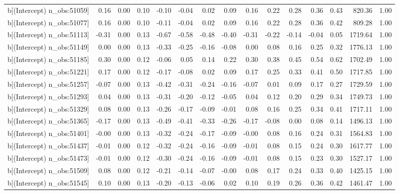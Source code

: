 \begin{table}[ht]
\begin{tabular}{rrrrrrrrrrrrrrr}
  b[(Intercept) n\_obs:51059] & 0.16 & 0.00 & 0.10 & -0.10 & -0.04 & 0.02 & 0.09 & 0.16 & 0.22 & 0.28 & 0.36 & 0.43 & 820.36 & 1.00 \\ 
  b[(Intercept) n\_obs:51077] & 0.16 & 0.00 & 0.10 & -0.11 & -0.04 & 0.02 & 0.09 & 0.16 & 0.22 & 0.28 & 0.36 & 0.42 & 809.28 & 1.00 \\ 
  b[(Intercept) n\_obs:51113] & -0.31 & 0.00 & 0.13 & -0.67 & -0.58 & -0.48 & -0.40 & -0.31 & -0.22 & -0.14 & -0.04 & 0.05 & 1719.64 & 1.00 \\ 
  b[(Intercept) n\_obs:51149] & 0.00 & 0.00 & 0.13 & -0.33 & -0.25 & -0.16 & -0.08 & 0.00 & 0.08 & 0.16 & 0.25 & 0.32 & 1776.13 & 1.00 \\ 
  b[(Intercept) n\_obs:51185] & 0.30 & 0.00 & 0.12 & -0.06 & 0.05 & 0.14 & 0.22 & 0.30 & 0.38 & 0.45 & 0.54 & 0.62 & 1702.49 & 1.00 \\ 
  b[(Intercept) n\_obs:51221] & 0.17 & 0.00 & 0.12 & -0.17 & -0.08 & 0.02 & 0.09 & 0.17 & 0.25 & 0.33 & 0.41 & 0.50 & 1717.85 & 1.00 \\ 
  b[(Intercept) n\_obs:51257] & -0.07 & 0.00 & 0.13 & -0.42 & -0.31 & -0.24 & -0.16 & -0.07 & 0.01 & 0.09 & 0.17 & 0.27 & 1729.59 & 1.00 \\ 
  b[(Intercept) n\_obs:51293] & 0.04 & 0.00 & 0.13 & -0.31 & -0.20 & -0.12 & -0.05 & 0.04 & 0.12 & 0.20 & 0.29 & 0.34 & 1749.73 & 1.00 \\ 
  b[(Intercept) n\_obs:51329] & 0.08 & 0.00 & 0.13 & -0.26 & -0.17 & -0.09 & -0.01 & 0.08 & 0.16 & 0.25 & 0.34 & 0.41 & 1717.11 & 1.00 \\ 
  b[(Intercept) n\_obs:51365] & -0.17 & 0.00 & 0.13 & -0.49 & -0.41 & -0.33 & -0.26 & -0.17 & -0.08 & 0.00 & 0.08 & 0.14 & 1496.13 & 1.00 \\ 
  b[(Intercept) n\_obs:51401] & -0.00 & 0.00 & 0.13 & -0.32 & -0.24 & -0.17 & -0.09 & -0.00 & 0.08 & 0.16 & 0.24 & 0.31 & 1564.83 & 1.00 \\ 
  b[(Intercept) n\_obs:51437] & -0.01 & 0.00 & 0.12 & -0.32 & -0.24 & -0.16 & -0.09 & -0.01 & 0.08 & 0.15 & 0.24 & 0.30 & 1617.77 & 1.00 \\ 
  b[(Intercept) n\_obs:51473] & -0.01 & 0.00 & 0.12 & -0.30 & -0.24 & -0.16 & -0.09 & -0.01 & 0.08 & 0.15 & 0.23 & 0.30 & 1527.17 & 1.00 \\ 
  b[(Intercept) n\_obs:51509] & 0.08 & 0.00 & 0.12 & -0.21 & -0.14 & -0.07 & -0.00 & 0.08 & 0.17 & 0.24 & 0.33 & 0.40 & 1425.15 & 1.00 \\ 
  b[(Intercept) n\_obs:51545] & 0.10 & 0.00 & 0.13 & -0.20 & -0.13 & -0.06 & 0.02 & 0.10 & 0.19 & 0.26 & 0.36 & 0.42 & 1461.47 & 1.00 \\ 

\end{tabular}
\end{table}
